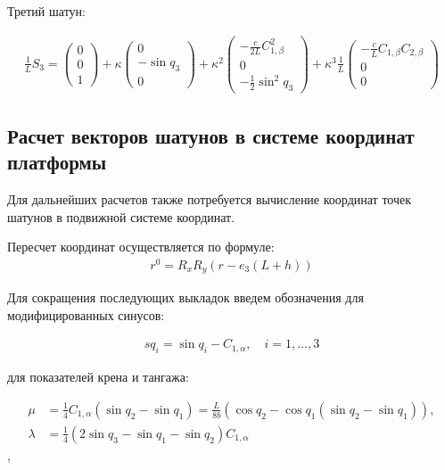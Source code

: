 Третий шатун:

\begin{equation}
\begin{aligned}
	\frac{1}{L}S_3 = \begin{pmatrix}0 \\ 0 \\ 1\end{pmatrix} + \kappa\begin{pmatrix}0 \\ -\sin{q_3}\\ 0\end{pmatrix} + \kappa^2\begin{pmatrix}-\frac{c}{2L}C^2_{1,\beta}\\0\\-\frac{1}{2}\sin^2{q_3}\end{pmatrix} + \kappa^3\frac{1}{L}\begin{pmatrix}-\frac{c}{L}C_{1,\beta}C_{2,\beta}\\0\\0\end{pmatrix}
\end{aligned}
\end{equation}

\subsection{Расчет векторов шатунов в системе координат платформы}

Для дальнейших расчетов также потребуется вычисление координат точек шатунов в подвижной системе координат.

Пересчет координат осуществляется по формуле:
\begin{equation}
\begin{aligned}
	r^0 = R_xR_y\left(r - e_3\left(L + h\right)\right)
\end{aligned}
\end{equation}

Для сокращения последующих выкладок введем обозначения для модифицированных синусов:

\begin{equation}
\begin{aligned}
	sq_i = \sin{q_i} - C_{1,\alpha},\quad i =1,\ldots,3
\end{aligned}
\end{equation}

для показателей крена и тангажа:

\begin{equation}
\begin{aligned}
	\mu & = \frac{1}{4}C_{1,\alpha}\left(\sin{q_2} - \sin{q_1}\right) = \frac{L}{8b}\left(\cos{q_2}-\cos{q_1}\left(\sin{q_2}-\sin{q_1}\right)\right),\\
	\lambda & = \frac{1}{4}\left(2\sin{q_3}-\sin{q_1}-\sin{q_2}\right)C_{1,\alpha}
\end{aligned}
\end{equation},


